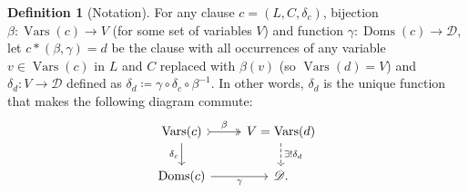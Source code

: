 \documentclass{article}
\theoremstyle{definition}
\newtheorem{definition}{Definition}
\DeclareMathOperator{\Doms}{Doms}
\DeclareMathOperator{\Vars}{Vars}
\begin{document}
\begin{definition}[Notation]
  For any clause $c = (L, C, \delta_c)$, bijection $\beta\colon \Vars(c) \to V$ (for some set of variables $V$) and function $\gamma\colon \Doms(c) \to \mathscr{D}$, let $c \ast (\beta, \gamma) = d$ be the clause with all occurrences of any variable $v \in \Vars(c)$ in $L$ and $C$ replaced with $\beta(v)$ (so $\Vars(d) = V$) and $\delta_d\colon V \to \mathscr{D}$ defined as $\delta_d \coloneqq \gamma \circ \delta_c \circ \beta^{-1}$. In other words, $\delta_d$ is the unique function that makes the following diagram commute:
  \[
  \begin{tikzcd}
    \Vars(c) \ar[r, tail, two heads, "\beta"] \arrow[d, swap, "\delta_c"] & V = \Vars(d) \ar[d, dashed, "\exists!\delta_d"] \\
    \Doms(c) \ar[r, swap, "\gamma"] & \mathscr{D}.
  \end{tikzcd}
  \]
\end{definition}
\end{document}

